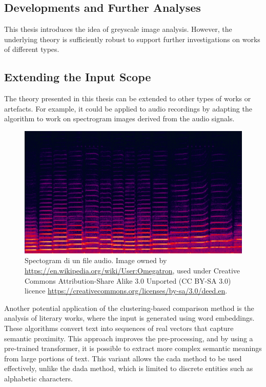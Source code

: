 \begin{toReview}
\section{Developments and Further Analyses}
This thesis introduces the idea of greyscale image analysis. However, the underlying theory is sufficiently robust to support further investigations on works of different types.

\subsection{Extending the Input Scope}
The theory presented in this thesis can be extended to other types of works or artefacts. For example, it could be applied to audio recordings by adapting the algorithm to work on spectrogram images derived from the audio signals.

\begin{figure}[h]
	\includegraphics[width=0.8\linewidth]{Figures/Spectrogram.png}
	\caption[Spectogram of a file audio]{Spectogram di un file audio. Image owned by \url{https://en.wikipedia.org/wiki/User:Omegatron}, used under Creative Commons Attribution-Share Alike 3.0 Unported (CC BY-SA 3.0) licence \url{https://creativecommons.org/licenses/by-sa/3.0/deed.en}.}
\end{figure}

\noindent Another potential application of the clustering-based comparison method is the analysis of literary works, where the input is generated using word embeddings. These algorithms convert text into sequences of real vectors that capture semantic proximity. This approach improves the pre-processing, and by using a pre-trained transformer, it is possible to extract more complex semantic meanings from large portions of text. This variant allows the \gls{cada} method to be used effectively, unlike the \gls{dada} method, which is limited to discrete entities such as alphabetic characters.


\end{toReview}
